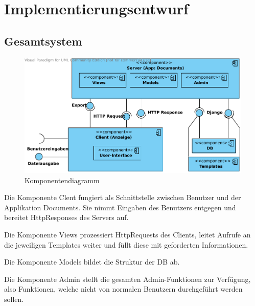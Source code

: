 \chapter{Implementierungsentwurf}


\section{Gesamtsystem}
\begin{figure}[!htb]
\includegraphics[width=0.8\linewidth]{bilder/Komponentendiagramm.pdf}
\caption{Komponentendiagramm}
\label{fig:KompDiagramm}
\end{figure}

Die Komponente Clent fungiert als Schnittstelle zwischen Benutzer und der 
Applikation Documents. Sie nimmt Eingaben des Benutzers entgegen und bereitet 
HttpResponses des Servers auf.

Die Komponente Views prozessiert HttpRequests des Clients, leitet Aufrufe an die
jeweiligen Templates weiter und füllt diese mit geforderten Informationen.

Die Komponente Models bildet die Struktur der DB ab.

Die Komponente Admin stellt die gesamten Admin-Funktionen zur Verfügung, also 
Funktionen, welche nicht von normalen Benutzern durchgeführt werden sollen.

